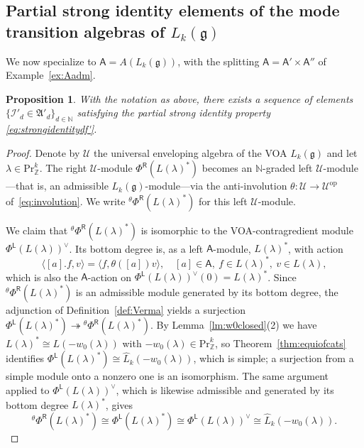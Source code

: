 \documentclass[12pt,a4paper,reqno]{amsart}
\numberwithin{equation}{section}
\newtheorem{proposition}[theorem]{Proposition}
\theoremstyle{definition}
\newcommand{\g}{\mathfrak{g}}
\newcommand{\N}{\mathbb{N}}
\newcommand{\Z}{\mathbb{Z}}
\newcommand{\I}{\mathscr{I}}
\def\L{\mathsf{L}}
\def\R{\mathsf{R}}
\def\Pr{\mathrm{Pr}}
\def\la{\lambda}
\def\ra{\rightarrow}
\def\scrU{\mathscr{U}}
\def\fA{\mathfrak{A}}
\def\<{\langle}
\def\>{\rangle}
\def\A{\mathsf{A}}
\begin{document}
\subsection{Partial strong identity elements of the mode transition algebras of $L_k(\g)$}
We now specialize to $\A=A(L_k(\g))$, with the splitting $\A=\A'\times \A''$ of Example~\ref{ex:Aadm}.

\begin{proposition}\label{prop:partial_strong_identity}
  With the notation as above, there exists a sequence of elements $\{\I'_d\in \fA'_d\}_{d\in \N}$ satisfying the partial strong identity property
  \eqref{eq:strongidentitydf'}.
\end{proposition}
\begin{proof}
Denote by $\scrU$ the universal enveloping algebra of the VOA $L_k(\g)$ and let $\la\in \Pr^k_\Z$. The right $\scrU$-module $\Phi^\R(L(\la)^\ast)$ becomes an $\N$-graded left $\scrU$-module---that is, an admissible $L_k(\g)$-module---via the anti-involution $\theta:\scrU\ra\scrU^{\mathrm{op}}$ of~\eqref{eq:involution}. We write ${}^\theta\Phi^\R(L(\la)^\ast)$ for this left $\scrU$-module.



We claim that
${}^\theta\Phi^\R(L(\la)^\ast)$ is isomorphic to the VOA-contragredient module $\Phi^\L(L(\la))^\vee$. Its bottom degree is, as a left $\A$-module, $L(\la)^\ast$, with action
\[
\<[a].f,v\>=\<f,\theta([a])v\>,\quad [a]\in \A,\ f\in L(\la)^\ast,\ v\in L(\la),
\]
which is also the $\A$-action on $\Phi^\L(L(\la))^\vee(0)=L(\la)^\ast$. Since ${}^\theta\Phi^\R(L(\la)^\ast)$ is an admissible module generated by its bottom degree, the adjunction of Definition~\ref{def:Verma} yields a surjection $\Phi^\L(L(\la)^\ast)\twoheadrightarrow{}^\theta\Phi^\R(L(\la)^\ast)$. By Lemma~\ref{lm:w0closed}(2) we have $L(\la)^\ast\cong L(-w_0(\la))$ with $-w_0(\la)\in \Pr^k_\Z$, so Theorem~\ref{thm:equiofcats} identifies $\Phi^\L(L(\la)^\ast)\cong \hat{L}_k(-w_0(\la))$, which is simple; a surjection from a simple module onto a nonzero one is an isomorphism. The same argument applied to $\Phi^\L(L(\la))^\vee$, which is likewise admissible and generated by its bottom degree $L(\la)^\ast$, gives
\begin{equation}\label{eq:contragredient}
    {}^\theta\Phi^\R(L(\la)^\ast)\cong \Phi^\L(L(\la)^\ast)\cong  \Phi^\L(L(\la))^\vee\cong \hat{L}_k(-w_0(\la)).
\end{equation}


\end{proof}
\end{document}
